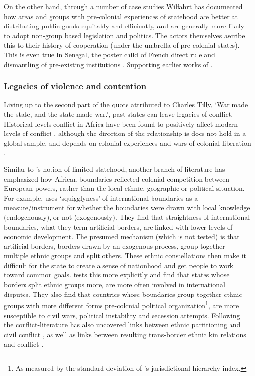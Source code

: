 On the other hand, through a number of case studies Wilfahrt
\citeyear{Wilfahrt2018, Wilfahrt_2021} has documented how areas and groups with
pre-colonial experiences of statehood are better at distributing public goods
equitably and efficiently, and are generally more likely to adopt non-group
based legislation and politics. The actors themselves ascribe this to their
history of cooperation (under the umbrella of pre-colonial states). This is even
true in Senegal, the poster child of French direct rule and dismantling of
pre-existing institutions \citep{Wilfahrt_2021}. Supporting earlier works of
\citet{Gennaioli_2007, Gennaioli2007a}.

\subsubsection{Legacies of violence and contention} 
\label{Legacies of violence and contention}

Living up to the second part of the quote attributed to Charles Tilly, `War
made the state, and the state made war.', past states can leave legacies of
conflict. Historical levels conflict in Africa have been found to positively
affect modern levels of conflict \citep{Besley2014}, although the direction of
the relationship is does not hold in a global sample, and depends on colonial
experiences and wars of colonial liberation \citep{Fearon2014}. 


Similar to \citet{Clapham1996}'s notion of limited statehood, another branch of
literature has emphasized how African boundaries reflected colonial competition
between European powers, rather than the local ethnic, geographic or political
situation. For example, \citet{Alesina2011} uses `squigglyness' of international
boundaries as a measure/instrument for whether the boundaries were drawn with
local knowledge (endogenously), or not (exogenously). They find that
straightness of international boundaries, what they term artificial borders, are
linked with lower levels of economic development. The presumed mechanism (which
is not tested) is that artificial borders, borders drawn by an exogenous
process, group together multiple ethnic groups and split others. These ethnic
constellations then make it difficult for the state to create a sense of
nationhood and get people to work toward common goals. \citet{Englebert2002}
tests this more explicitly and find that states whose borders split ethnic
groups more, are more often involved in international disputes. They also find
that countries whose boundaries group together ethnic groups with more different
forms pre-colonial political organization\footnote{As measured by the standard
deviation of \citet{Murdock1967}'s jurisdictional hierarchy index.}, are more
susceptible to civil wars, political instability and secession attempts.
Following \citet{Englebert2002} the conflict-literature has also uncovered links
between ethnic partitioning and civil conflict \citep{Ito2020,
Michalopoulos2016}, as well as links between resulting trans-border ethnic kin
relations and conflict \citep{Cederman2013, Salehyan2009, Weidmann2015}. 

